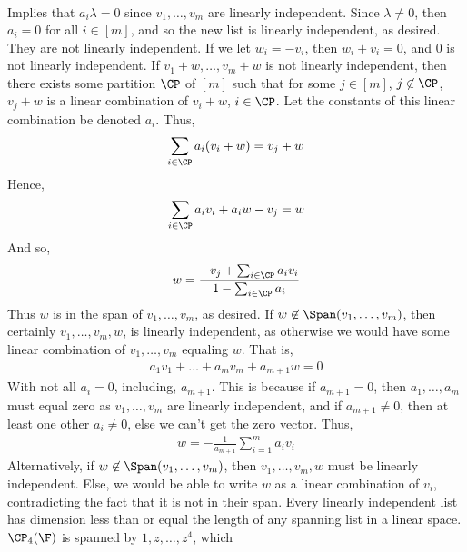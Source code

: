 \documentclass{book}
\begin{document}
\begin{enumerate}[label=\arabic*)]
\begin{align*}
        \end{align*}
        Implies that $a_i\lambda = 0$ since $v_1, \dots, v_m$ are linearly independent. Since $\lambda \neq 0$, then $a_i = 0$ for all $i \in [m]$, and so the new list is
        linearly independent, as desired.
      \ii
        They are not linearly independent. If we let $w_i = -v_i$, then $w_i + v_i = 0$, and $0$ is not linearly independent.
      \ii
        If $v_1 + w, \dots, v_m + w$ is not linearly independent, then there exists some partition $\CP$ of $[m]$ such that for some $j \in [m]$, $j \not\in \CP$, $v_j + w$ is
        a linear combination of $v_i + w$, $i \in \CP$. Let the constants of this linear combination be denoted $a_i$. Thus,
        \begin{align*}
          \sum_{i \in \CP}a_i(v_i + w) = v_j + w
        \end{align*}
        Hence,
        \begin{align*}
          \sum_{i \in \CP}a_iv_i + a_iw - v_j = w
        \end{align*}
        And so,
        \begin{align*}
          w = \frac{-v_j + \sum_{i \in \CP}a_iv_i}{1 - \sum_{i \in \CP}a_i}
        \end{align*}
        Thus $w$ is in the span of $v_1, \dots, v_m$, as desired.
      \ii
        If $w \not\in \Span(v_1, \dots, v_m)$, then certainly $v_1, \dots, v_m, w$, is linearly independent, as otherwise we would have some linear combination of $v_1, \dots,
        v_m$ equaling $w$. That is,
        \begin{align*}
          a_1v_1 + \dots + a_mv_m + a_{m + 1}w = 0
        \end{align*}
        With not all $a_i = 0$, including, $a_{m + 1}$. This is because if $a_{m + 1} = 0$, then $a_1, \dots, a_m$ must equal zero as $v_1, \dots, v_m$ are linearly
        independent, and if $a_{m + 1} \neq 0$, then at least one other $a_i \neq 0$, else we can't get the zero vector. Thus,
        \begin{align*}
          w = -\frac{1}{a_{m + 1}}\sum_{i = 1}^{m}a_iv_i
        \end{align*}
        Alternatively, if $w \not\in \Span(v_1, \dots, v_m)$, then $v_1, \dots, v_m, w$ must be linearly independent. Else, we would be able to write $w$ as a linear
        combination of $v_i$, contradicting the fact that it is not in their span.
      \ii
        Every linearly independent list has dimension less than or equal the length of any spanning list in a linear space. $\CP_4(\F)$ is spanned by $1, z, \dots, z^4$, which

\end{enumerate}
\end{document}
